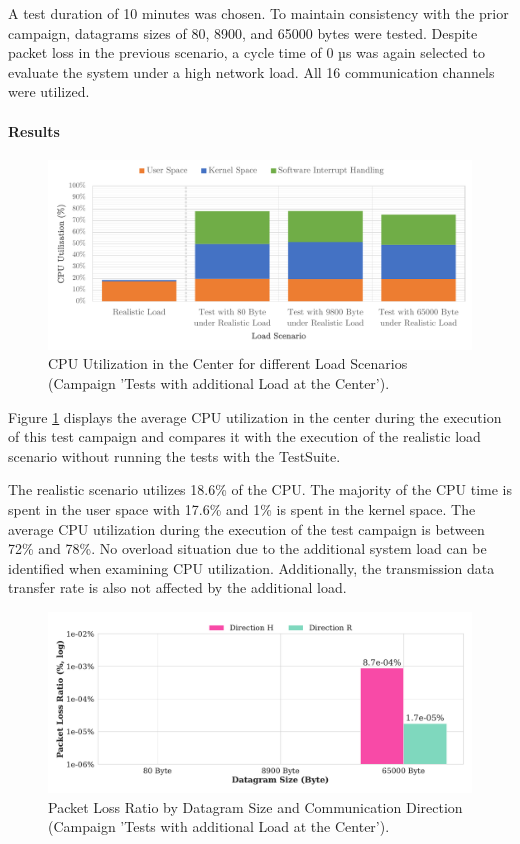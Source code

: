 A test duration of 10 minutes was chosen. To maintain consistency with the prior campaign, datagrams sizes of 80, 8900, and 65000 bytes were tested. Despite packet loss in the previous scenario, a cycle time of 0 µs was again selected to evaluate the system under a high network load. All 16 communication channels were utilized.

\paragraph{Results}

\begin{figure}[h]
    \centering
    \includegraphics[width=1\linewidth]{figures/reliability/ihawk/diagr7.pdf}
    \caption{CPU Utilization in the Center for different Load Scenarios (Campaign 'Tests with additional Load at the Center').}
    \label{fig:diagr7CPU}
\end{figure}

Figure \ref{fig:diagr7CPU} displays the average CPU utilization in the center during the execution of this test campaign and compares it with the execution of the realistic load scenario without running the tests with the TestSuite.

The realistic scenario utilizes 18.6\% of the CPU. The majority of the CPU time is spent in the user space with 17.6\% and 1\% is spent in the kernel space. The average CPU utilization during the execution of the test campaign is between 72\% and 78\%. No overload situation due to the additional system load can be identified when examining CPU utilization. Additionally, the transmission data transfer rate is also not affected by the additional load.

\begin{figure}[h]
    \centering
    \includegraphics[width=1\linewidth]{figures/reliability/ihawk/diagr8.pdf}
    \caption{Packet Loss Ratio by Datagram Size and Communication Direction (Campaign 'Tests with additional Load at the Center').}
    \label{fig:diagr8Loss}
\end{figure}

